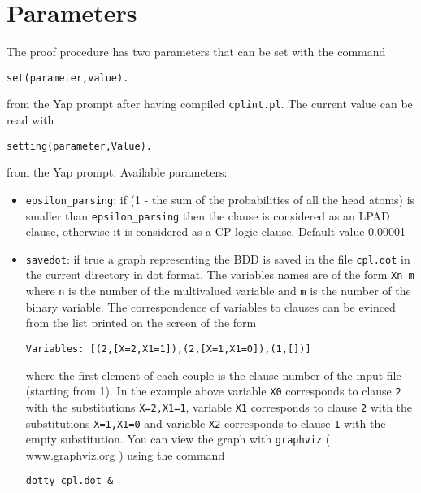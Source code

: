 \documentclass{article}
\newcommand{\href}[2]{\Link[#1]{}{} #2 \EndLink}
\begin{document}
\section{Parameters}
The proof procedure has two parameters that can be set with the command
\begin{verbatim}
set(parameter,value).
\end{verbatim}
from the Yap prompt after having compiled \texttt{cplint.pl}.
The current value can be read with
\begin{verbatim}
setting(parameter,Value).
\end{verbatim}
from the Yap prompt.
Available parameters:
\begin{itemize}
\item 
	 \verb|epsilon_parsing|: if (1 - the sum of the probabilities of all the head atoms) is smaller than 
    \verb|epsilon_parsing|
		then the clause is considered as an LPAD clause, otherwise it is considered as a CP-logic
		clause. Default value 0.00001
\item 	\texttt{savedot}: if true a graph representing the BDD is saved in the file \texttt{cpl.dot} in the current directory in dot format.
		The variables names are of the form \verb|Xn_m| where \texttt{n} is the number of the multivalued
		variable and \texttt{m} is the number of the binary variable. The correspondence of variables to 
		clauses can be evinced from the list printed on the screen of the form
\begin{verbatim}
Variables: [(2,[X=2,X1=1]),(2,[X=1,X1=0]),(1,[])]
\end{verbatim}
		where the first element of each couple is the clause number of the input file (starting from 1).
		In the example above variable \texttt{X0} corresponds to clause \texttt{2} with the substitutions \texttt{X=2,X1=1},
		variable \texttt{X1} corresponds to clause \texttt{2} with the substitutions \texttt{X=1,X1=0} and
		variable \texttt{X2} corresponds to clause \texttt{1} with the empty substitution.
		You can view the graph with \texttt{graphviz} (\href{www.graphviz.org}{www.graphviz.org}) using the
		command
\begin{verbatim}
dotty cpl.dot &
\end{verbatim}
\end{itemize}
\end{document}
